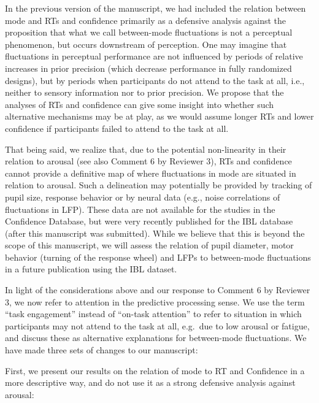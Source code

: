 \documentclass[
]{article}
\begin{document}
In the previous version of the manuscript, we had included the relation
between mode and RTs and confidence primarily as a defensive analysis
against the proposition that what we call between-mode fluctuations is
not a perceptual phenomenon, but occurs downstream of perception. One
may imagine that fluctuations in perceptual performance are not
influenced by periods of relative increases in prior precision (which
decrease performance in fully randomized designs), but by periods when
participants do not attend to the task at all, i.e., neither to sensory
information nor to prior precision. We propose that the analyses of RTs
and confidence can give some insight into whether such alternative
mechanisms may be at play, as we would assume longer RTs and lower
confidence if participants failed to attend to the task at all.

That being said, we realize that, due to the potential non-linearity in
their relation to arousal (see also Comment 6 by Reviewer 3), RTs and
confidence cannot provide a definitive map of where fluctuations in mode
are situated in relation to arousal. Such a delineation may potentially
be provided by tracking of pupil size, response behavior or by neural
data (e.g., noise correlations of fluctuations in LFP). These data are
not available for the studies in the Confidence Database, but were very
recently published for the IBL database (after this manuscript was
submitted). While we believe that this is beyond the scope of this
manuscript, we will assess the relation of pupil diameter, motor
behavior (turning of the response wheel) and LFPs to between-mode
fluctuations in a future publication using the IBL dataset.

In light of the considerations above and our response to Comment 6 by
Reviewer 3, we now refer to attention in the predictive processing
sense. We use the term ``task engagement'' instead of ``on-task
attention'' to refer to situation in which participants may not attend
to the task at all, e.g.~due to low arousal or fatigue, and discuss
these as alternative explanations for between-mode fluctuations. We have
made three sets of changes to our manuscript:

First, we present our results on the relation of mode to RT and
Confidence in a more descriptive way, and do not use it as a strong
defensive analysis against arousal:
\end{document}
